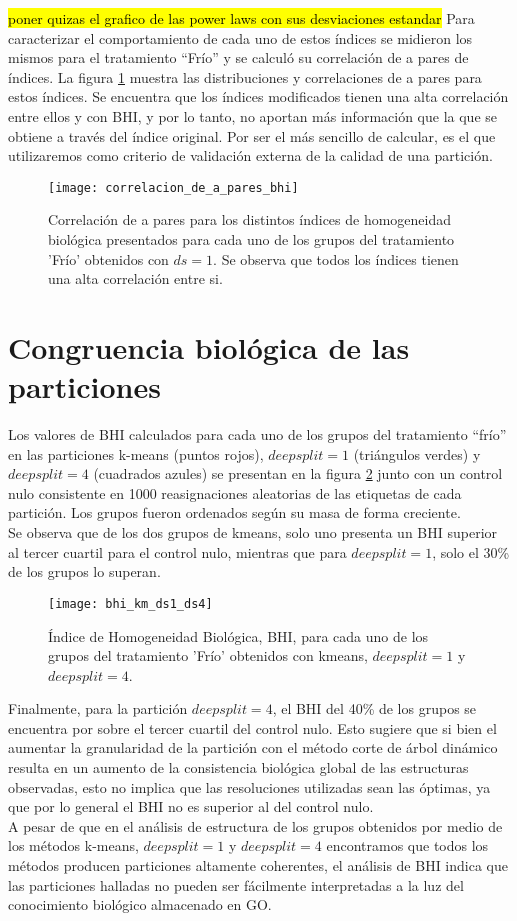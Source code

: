 \hl{poner quizas el grafico de las power laws con sus desviaciones estandar}
Para caracterizar el comportamiento de cada uno de estos índices se midieron los mismos para el tratamiento ``Frío'' y se calculó su correlación de a pares de índices. La figura \ref{fig:correlacion_de_a_pares_bhi} muestra las distribuciones y correlaciones de a pares para estos índices. Se encuentra que los índices modificados tienen una alta correlación entre ellos y con BHI, y por lo tanto, no aportan más información que la que se obtiene a través del índice original. Por ser el más sencillo de calcular, es el que utilizaremos como criterio de validación externa de la calidad de una partición.
\begin{figure}[h]
    \centering
    \texttt{[image: correlacion\_de\_a\_pares\_bhi]}
    \caption{Correlación de a pares para los distintos índices de homogeneidad biológica presentados para cada uno de los grupos del tratamiento 'Frío' obtenidos con $ds=1$. Se observa que todos los índices tienen una alta correlación entre si.}
    \label{fig:correlacion_de_a_pares_bhi}
\end{figure}

\section{Congruencia biológica de las particiones}
Los valores de BHI calculados para cada uno de los grupos del tratamiento ``frío'' en las particiones k-means (puntos rojos), $deepsplit=1$ (triángulos verdes) y $deepsplit=4$ (cuadrados azules) se presentan en la figura \ref{fig:bhi_km_ds1_ds4} junto con un control nulo consistente en 1000 reasignaciones aleatorias de las etiquetas de cada partición. Los grupos fueron ordenados según su masa de forma creciente.\\
Se observa que de los dos grupos de kmeans, solo uno presenta un BHI superior al tercer cuartil para el control nulo, mientras que para $deepsplit=1$, solo el 30\% de los grupos lo superan.
\begin{figure}[h]
    \centering
    \texttt{[image: bhi\_km\_ds1\_ds4]}
    \caption{Índice de Homogeneidad Biológica, BHI, para cada uno de los grupos del tratamiento 'Frío' obtenidos con kmeans, $deepsplit=1$ y $deepsplit=4$.}
    \label{fig:bhi_km_ds1_ds4}
\end{figure}
Finalmente, para la partición $deepsplit=4$, el BHI del 40\% de los grupos se encuentra por sobre el tercer cuartil del control nulo. Esto sugiere que si bien el aumentar la granularidad de la partición con el método corte de árbol dinámico resulta en un aumento de la consistencia biológica global de las estructuras observadas, esto no implica que las resoluciones utilizadas sean las óptimas, ya que por lo general el BHI no es superior al del control nulo.\\
A pesar de que en el análisis de estructura de los grupos obtenidos por medio de los métodos k-means, $deepsplit=1$ y $deepsplit=4$ encontramos que todos los métodos producen particiones altamente coherentes, el análisis de BHI indica que las particiones halladas no pueden ser fácilmente interpretadas a la luz del conocimiento biológico almacenado en GO.